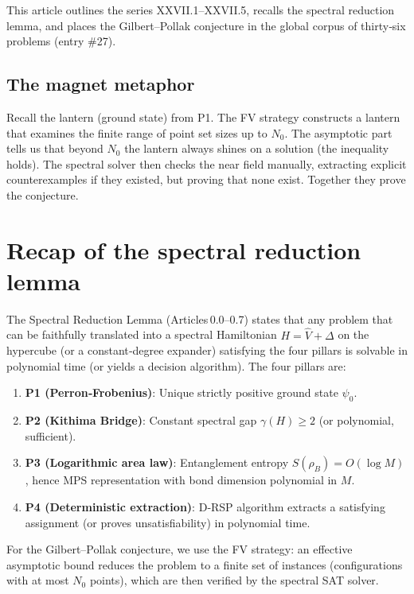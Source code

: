 \documentclass[11pt,a4paper]{article}
\begin{document}
This article outlines the series XXVII.1–XXVII.5, recalls the spectral reduction lemma, and places the Gilbert–Pollak conjecture in the global corpus of thirty‑six problems (entry \#27).

\subsection*{The magnet metaphor}

Recall the lantern (ground state) from P1. The FV strategy constructs a lantern that examines the finite range of point set sizes up to \(N_0\). The asymptotic part tells us that beyond \(N_0\) the lantern always shines on a solution (the inequality holds). The spectral solver then checks the near field manually, extracting explicit counterexamples if they existed, but proving that none exist. Together they prove the conjecture.

\section{Recap of the spectral reduction lemma}

The Spectral Reduction Lemma (Articles 0.0–0.7) states that any problem that can be faithfully translated into a spectral Hamiltonian \(H = \hat{V} + \Delta\) on the hypercube (or a constant‑degree expander) satisfying the four pillars is solvable in polynomial time (or yields a decision algorithm). The four pillars are:

\begin{enumerate}
\item \textbf{P1 (Perron‑Frobenius)}: Unique strictly positive ground state \(\psi_0\).
\item \textbf{P2 (Kithima Bridge)}: Constant spectral gap \(\gamma(H) \ge 2\) (or polynomial, sufficient).
\item \textbf{P3 (Logarithmic area law)}: Entanglement entropy \(S(\rho_B)=O(\log M)\), hence MPS representation with bond dimension polynomial in \(M\).
\item \textbf{P4 (Deterministic extraction)}: D‑RSP algorithm extracts a satisfying assignment (or proves unsatisfiability) in polynomial time.
\end{enumerate}

For the Gilbert–Pollak conjecture, we use the FV strategy: an effective asymptotic bound reduces the problem to a finite set of instances (configurations with at most \(N_0\) points), which are then verified by the spectral SAT solver.
\end{document}
